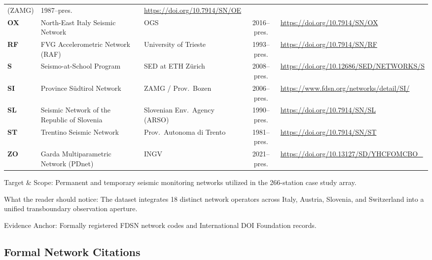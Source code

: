 \begin{landscape}
\begin{table}[htbp]
\begin{threeparttable}
\begin{tabularx}{\linewidth}{l l l c X}
        (ZAMG) & 1987--pres. & \url{https://doi.org/10.7914/SN/OE} \\
        \textbf{OX} & North-East Italy Seismic Network & \ac{OGS} &
        2016--pres. & \url{https://doi.org/10.7914/SN/OX} \\
        \textbf{RF} & \ac{FVG} Accelerometric Network (RAF) & University of
        Trieste & 1993--pres. & \url{https://doi.org/10.7914/SN/RF} \\
        \textbf{S}  & Seismo-at-School Program & \ac{SED} at ETH Z\"urich &
        2008--pres. & \url{https://doi.org/10.12686/SED/NETWORKS/S} \\
        \textbf{SI} & Province S\"udtirol Network & ZAMG /
        Prov.\ Bozen & 2006--pres. &
        \url{https://www.fdsn.org/networks/detail/SI/} \\
        \textbf{SL} & Seismic Network of the Republic of Slovenia &
        Slovenian Env.\ Agency (\ac{ARSO}) & 1990--pres. &
        \url{https://doi.org/10.7914/SN/SL} \\
        \textbf{ST} & Trentino Seismic Network & Prov.\ Autonoma di
        Trento & 1981--pres. & \url{https://doi.org/10.7914/SN/ST} \\
        \textbf{ZO} & Garda Multiparametric Network (PDnet) & \ac{INGV} &
        2021--pres. & \url{https://doi.org/10.13127/SD/YHCFOMCBO_} \\
        \bottomrule
      \end{tabularx}
      \begin{tablenotes}[flushleft]
        \footnotesize
      \item Target \& Scope: Permanent and temporary seismic
        monitoring networks utilized in the 266-station case study array.
      \item What the reader should notice: The dataset integrates 18
        distinct network operators across Italy, Austria, Slovenia,
        and Switzerland into a unified transboundary observation aperture.
      \item Evidence Anchor: Formally registered \ac{FDSN} network codes and
        International DOI Foundation records.
      \end{tablenotes}
    \end{threeparttable}
  \end{table}
\end{landscape}

\subsection*{Formal Network Citations}


